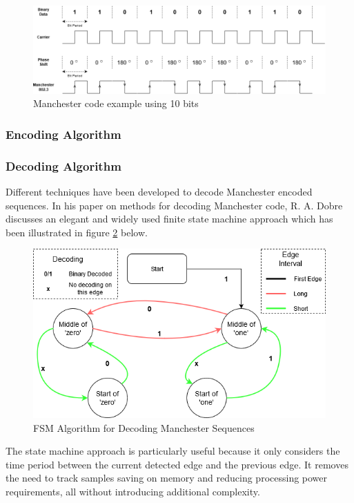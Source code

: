 \begin{figure}[H]
	\centering
	\includegraphics[width=0.7\linewidth]{figures/litreview/manchester_encoding}
	\caption{Manchester code example using 10 bits}
	\label{fig:manchesterencoding}
\end{figure}

\subsubsection{Encoding Algorithm}



\subsubsection{Decoding Algorithm}
Different techniques have been developed to decode Manchester encoded sequences. In his paper on methods for decoding Manchester code, R. A. Dobre discusses an elegant and widely used finite state machine approach which has been illustrated in figure \ref{fig:manchesterdecodingfsm} below. \cite{Dobre2014}

\begin{figure}[H]
	\centering
	\includegraphics[width=0.7\linewidth]{figures/litreview/manchester_decoding_fsm.png}
	\caption{FSM Algorithm for Decoding Manchester Sequences}
	\label{fig:manchesterdecodingfsm}
\end{figure}

The state machine approach is particularly useful because it only considers the time period between the current detected edge and the previous edge. It removes the need to track samples saving on memory and reducing processing power requirements, all without introducing additional complexity.

